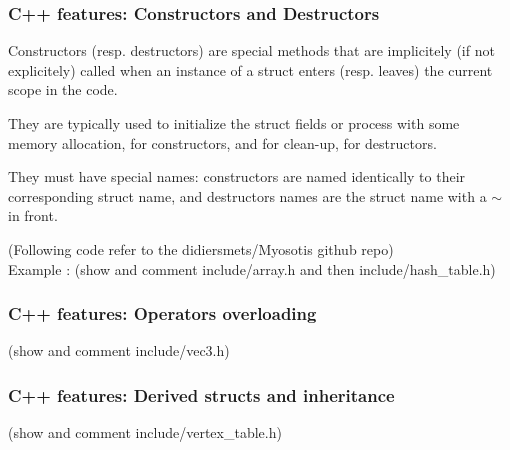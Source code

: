 \documentclass[8pt]{beamer}
\begin{document}
\begin{frame}[containsverbatim]
\frametitle{C++ features: Constructors and Destructors}

Constructors (resp. destructors) are special methods that are implicitely 
(if not explicitely) called when an instance of a struct enters (resp. leaves) 
the current scope in the code.\\


\medskip

They are typically used to initialize the struct fields or process with
some memory allocation, for constructors, and for clean-up, for destructors.

\medskip

They must have special names: constructors are named identically to their 
corresponding struct name, and destructors names are the struct name with
a $\sim$ in front.

\medskip

(Following code refer to the didiersmets/Myosotis github repo)\\
Example  : (show and comment include/array.h  and then include/hash\_table.h)



\end{frame}

\begin{frame}[containsverbatim]
\frametitle{C++ features: Operators overloading}

(show and comment include/vec3.h)



\end{frame}

\begin{frame}[containsverbatim]
\frametitle{C++ features: Derived structs and inheritance}

(show and comment include/vertex\_table.h)

\end{frame}
\end{document}
